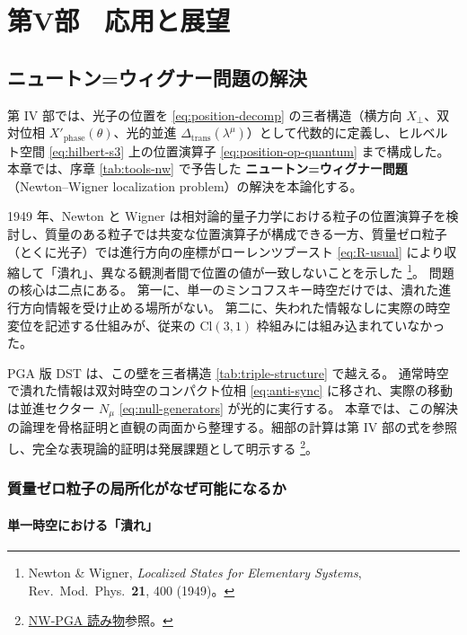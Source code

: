 \documentclass[dvipdfmx,a4paper,oneside]{jsbook}
\numberwithin{equation}{chapter}
\begin{document}
\newpage

\part{第V部　応用と展望}

\chapter{ニュートン=ウィグナー問題の解決}

第 IV 部では、光子の位置を \eqref{eq:position-decomp} の三者構造（横方向 \(X_\perp\)、双対位相 \(X'_{\mathrm{phase}}(\theta)\)、光的並進 \(\Delta_{\mathrm{trans}}(\lambda^\mu)\)）として代数的に定義し、ヒルベルト空間 \eqref{eq:hilbert-s3} 上の位置演算子 \eqref{eq:position-op-quantum} まで構成した。
本章では、序章 \eqref{tab:tools-nw} で予告した \textbf{ニュートン=ウィグナー問題}（Newton--Wigner localization problem）の解決を本論化する。

1949 年、Newton と Wigner は相対論的量子力学における粒子の位置演算子を検討し、質量のある粒子では共変な位置演算子が構成できる一方、質量ゼロ粒子（とくに光子）では進行方向の座標がローレンツブースト \eqref{eq:R-usual} により収縮して「潰れ」、異なる観測者間で位置の値が一致しないことを示した \footnote{Newton \& Wigner, \textit{Localized States for Elementary Systems}, Rev.\ Mod.\ Phys.\ \textbf{21}, 400 (1949)。}。
問題の核心は二点にある。
第一に、単一のミンコフスキー時空だけでは、潰れた進行方向情報を受け止める場所がない。
第二に、失われた情報なしに実際の時空変位を記述する仕組みが、従来の \(\mathrm{Cl}(3,1)\) 枠組みには組み込まれていなかった。

PGA 版 DST は、この壁を三者構造 \eqref{tab:triple-structure} で越える。
通常時空で潰れた情報は双対時空のコンパクト位相 \eqref{eq:anti-sync} に移され、実際の移動は並進セクター \(N_\mu\) \eqref{eq:null-generators} が光的に実行する。
本章では、この解決の論理を骨格証明と直観の両面から整理する。細部の計算は第 IV 部の式を参照し、完全な表現論的証明は発展課題として明示する \footnote{\hyperref[sec:sister-manuscripts]{NW-PGA 読み物}参照。}。

\section{質量ゼロ粒子の局所化がなぜ可能になるか}

\subsection{単一時空における「潰れ」}
\end{document}
